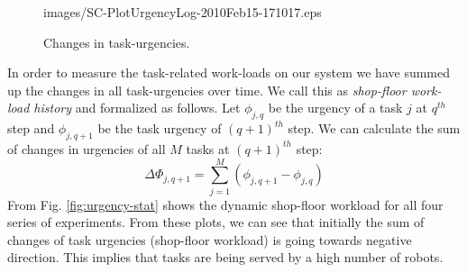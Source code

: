 \documentclass[final,5p,times,twocolumn]{elsarticle}
\begin{document}
\begin{figure}
{{images/SC-PlotUrgencyLog-2010Feb15-171017.eps}}
\newline
{}
\newline
\caption{Changes in task-urgencies.}
\end{figure}
In order to measure the task-related work-loads on our system we have summed up the changes in all task-urgencies over time. We call this as {\em shop-floor work-load history} and formalized as follows. Let $ \phi_{j, q}$ be the urgency of a task $j$ at $q^{th}$ step and $\phi_{j, q+1}$ be the task urgency of $(q+1)^{th}$ step. We can calculate the sum of changes in urgencies of all $M$ tasks at $(q+1)^{th}$ step:
\begin{equation} 
\Delta \Phi_{j, q+1} = \sum_{j=1}^{M} (\phi_{j, q+1} - \phi_{j, q})
\label{eqn:Delta-Phi}
\end{equation}
From Fig. \ref{fig:urgency-stat} shows the dynamic shop-floor workload for all four series of experiments. From these plots, we can see that initially the sum of changes of task urgencies (shop-floor workload) is going towards negative direction. This implies that tasks are being served by a high number of robots. 
\end{document}
